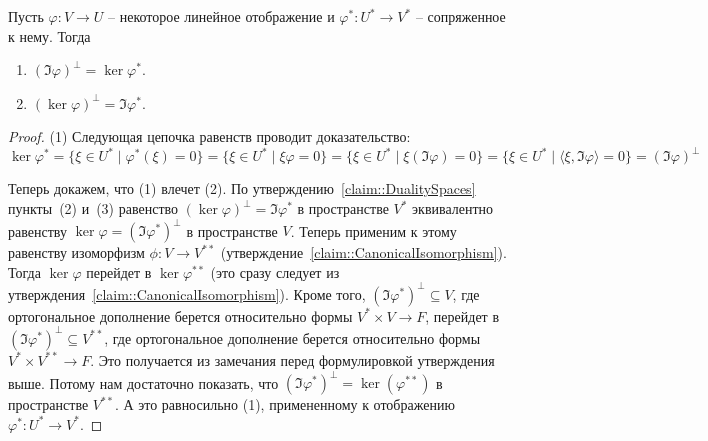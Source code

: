 \begin{claim}
\label{claim::Fredholm}
Пусть $\varphi\colon V\to U$ -- некоторое линейное отображение и $\varphi^*\colon U^*\to V^*$ -- сопряженное к нему.
Тогда
\begin{enumerate}
\item $(\Im \varphi)^\bot = \ker \varphi^*$.

\item $(\ker \varphi)^\bot = \Im \varphi^*$.
\end{enumerate}
\end{claim}
\begin{proof}
(1) Следующая цепочка равенств проводит доказательство:
\[
\ker\varphi^* =\{\xi \in U^*\mid \varphi^*(\xi) = 0\} = \{\xi \in U^*\mid \xi \varphi = 0\} = \{\xi\in U^*\mid \xi(\Im \varphi) = 0\} = \{\xi\in U^*\mid \langle \xi, \Im\varphi\rangle = 0\} = (\Im \varphi)^\bot
\]


Теперь докажем, что (1) влечет (2).
По утверждению~\ref{claim::DualitySpaces} пункты~(2) и~(3) равенство $(\ker \varphi)^\bot = \Im \varphi^*$ в пространстве $V^*$  эквивалентно равенству $\ker \varphi = (\Im \varphi^*)^\bot$ в пространстве $V$.
Теперь применим к этому равенству изоморфизм $\phi\colon V\to V^{**}$ (утверждение~\ref{claim::CanonicalIsomorphism}).
Тогда $\ker \varphi$ перейдет в $\ker \varphi^{**}$ (это сразу следует из утверждения~\ref{claim::CanonicalIsomorphism}).
Кроме того, $(\Im \varphi^*)^\bot \subseteq V$, где ортогональное дополнение берется относительно формы $V^*\times V\to F$, перейдет в $(\Im \varphi^*)^\bot\subseteq V^{**}$, где ортогональное дополнение берется относительно формы $V^*\times V^{**}\to F$.
Это получается из замечания перед формулировкой утверждения выше.
Потому нам достаточно показать, что $(\Im \varphi^*)^\bot = \ker(\varphi^{**})$ в пространстве $V^{**}$.
А это равносильно (1), примененному к отображению $\varphi^*\colon U^*\to V^*$.
\end{proof}

